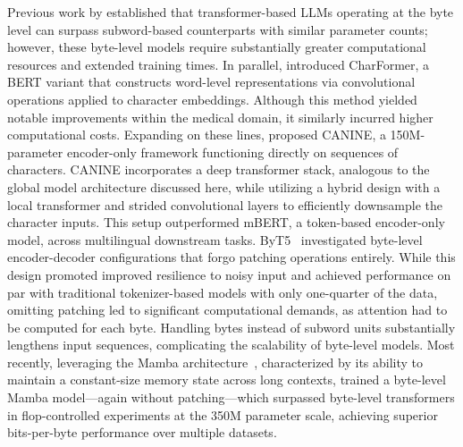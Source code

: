 Previous work by \cite{Choe2019BridgingTG} established that transformer-based LLMs operating at the byte level can surpass subword-based counterparts with similar parameter counts; however, these byte-level models require substantially greater computational resources and extended training times. In parallel, \cite{el2020characterbert} introduced CharFormer, a BERT variant that constructs word-level representations via convolutional operations applied to character embeddings. Although this method yielded notable improvements within the medical domain, it similarly incurred higher computational costs. Expanding on these lines, \cite{clark2022canine} proposed CANINE, a 150M-parameter encoder-only framework functioning directly on sequences of characters. CANINE incorporates a deep transformer stack, analogous to the global model architecture discussed here, while utilizing a hybrid design with a local transformer and strided convolutional layers to efficiently downsample the character inputs. This setup outperformed mBERT, a token-based encoder-only model, across multilingual downstream tasks. ByT5~\citep{xue2022byt5} investigated byte-level encoder-decoder configurations that forgo patching operations entirely. While this design promoted improved resilience to noisy input and achieved performance on par with traditional tokenizer-based models with only one-quarter of the data, omitting patching led to significant computational demands, as attention had to be computed for each byte. Handling bytes instead of subword units substantially lengthens input sequences, complicating the scalability of byte-level models. Most recently, leveraging the Mamba architecture~\citep{gu2023mamba}, characterized by its ability to maintain a constant-size memory state across long contexts, \cite{wang2024mambabyte} trained a byte-level Mamba model—again without patching—which surpassed byte-level transformers in flop-controlled experiments at the 350M parameter scale, achieving superior bits-per-byte performance over multiple datasets.

